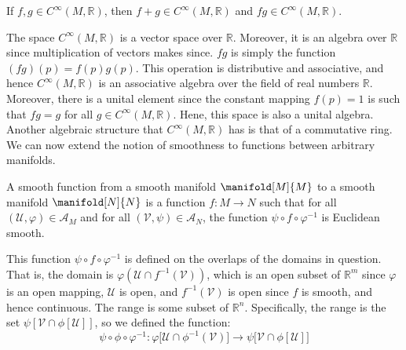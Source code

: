 \documentclass{article}                                                        %
\begin{document}
            \begin{theorem}
                If $f,g\in{C}^{\infty}(M,\mathbb{R})$, then
                $f+g\in{C}^{\infty}(M,\mathbb{R})$ and
                $fg\in{C}^{\infty}(M,\mathbb{R})$.
            \end{theorem}
            The space $C^{\infty}(M,\mathbb{R})$ is a vector space over
            $\mathbb{R}$. Moreover, it is an algebra over $\mathbb{R}$ since
            multiplication of vectors makes since. $fg$ is simply the function
            $(fg)(p)=f(p)g(p)$. This operation is distributive and associative,
            and hence $C^{\infty}(M,\mathbb{R})$ is an associative algebra over
            the field of real numbers $\mathbb{R}$. Moreover, there is a unital
            element since the constant mapping $f(p)=1$ is such that
            $fg=g$ for all $g\in{C}^{\infty}(M,\mathbb{R})$. Hene, this space is
            also a unital algebra. Another algebraic structure that
            $C^{\infty}(M,\mathbb{R})$ has is that of a commutative ring. We can
            now extend the notion of smoothness to functions between arbitrary
            manifolds.
            \begin{definition}
                A smooth function from a smooth manifold $\manifold[M]{M}$ to a
                smooth manifold $\manifold[N]{N}$ is a function
                $f:M\rightarrow{N}$ such that for all
                $(\mathcal{U},\varphi)\in\mathcal{A}_{M}$ and for all
                $(\mathcal{V},\psi)\in\mathcal{A}_{N}$, the function
                $\psi\circ{f}\circ\varphi^{\minus{1}}$ is Euclidean smooth.
            \end{definition}
            This function $\psi\circ{f}\circ\varphi^{\minus{1}}$ is defined on
            the overlaps of the domains in question. That is, the domain is
            $\varphi(\mathcal{U}\cap{f}^{\minus{1}}(\mathcal{V}))$, which is an
            open subset of $\mathbb{R}^{m}$ since $\varphi$ is an open mapping,
            $\mathcal{U}$ is open, and $f^{\minus{1}}(\mathcal{V})$ is open
            since $f$ is smooth, and hence continuous. The range is some subset
            of $\mathbb{R}^{n}$. Specifically, the range is the set
            $\psi[\mathcal{V}\cap\phi[\mathcal{U}]]$, so we defined the
            function:
            \begin{equation}
                \psi\circ\phi\circ\varphi^{\minus{1}}:
                    \varphi\big[\mathcal{U}\cap
                        \phi^{\minus{1}}(\mathcal{V})\big]\rightarrow
                    \psi\big[\mathcal{V}\cap\phi[\mathcal{U}]\big]
            \end{equation}
\end{document}
